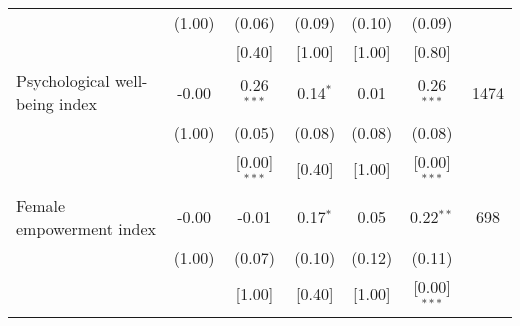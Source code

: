 {\begin{tabular}{l*{6}{c}}
          &   (1.00)&   (0.06)&   (0.09)&   (0.10)&   (0.09)&         \\
          &         &   [0.40]&   [1.00]&   [1.00]&   [0.80]&         \\
Psychological well-being index&    -0.00&0.26$^{***}$&0.14$^{*}$&     0.01&0.26$^{***}$&     1474\\
          &   (1.00)&   (0.05)&   (0.08)&   (0.08)&   (0.08)&         \\
          &         &[0.00]$^{***}$&   [0.40]&   [1.00]&[0.00]$^{***}$&         \\
Female empowerment index&    -0.00&    -0.01&0.17$^{*}$&     0.05&0.22$^{**}$&      698\\
          &   (1.00)&   (0.07)&   (0.10)&   (0.12)&   (0.11)&         \\
          &         &   [1.00]&   [0.40]&   [1.00]&[0.00]$^{***}$&         \\
\bottomrule
\end{tabular}
}
